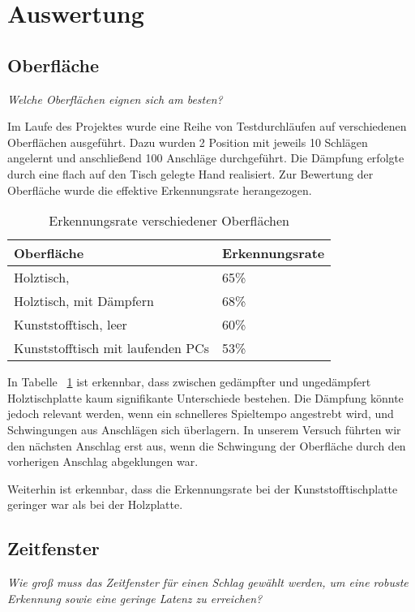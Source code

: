 \section{Auswertung}
\subsection*{Oberfläche}
\textit{Welche Oberflächen eignen sich am besten?}

Im Laufe des Projektes wurde eine Reihe von Testdurchläufen auf verschiedenen Oberflächen ausgeführt. Dazu wurden 2 Position mit jeweils 10 Schlägen angelernt und anschließend 100 Anschläge durchgeführt. Die Dämpfung erfolgte durch eine flach auf den Tisch gelegte Hand realisiert. Zur Bewertung der Oberfläche wurde die effektive Erkennungsrate herangezogen.


\begin{table}[h]   
	\centering
     
     \caption{Erkennungsrate verschiedener Oberflächen}
     \label{tab:surf}
\begin{tabular}{l l}
Oberfläche & Erkennungsrate \\
\hline
Holztisch, & 65\% \\
Holztisch, mit Dämpfern & 68\% \\
Kunststofftisch, leer & 60\% \\
Kunststofftisch mit laufenden PCs & 53\% \\

\end{tabular}
\end{table}



In Tabelle ~\ref{tab:surf} ist erkennbar, dass zwischen gedämpfter und ungedämpfert Holztischplatte kaum signifikante Unterschiede bestehen. Die Dämpfung könnte jedoch relevant werden, wenn ein schnelleres Spieltempo angestrebt wird, und Schwingungen aus Anschlägen sich überlagern. In unserem Versuch führten wir den nächsten Anschlag erst aus, wenn die Schwingung der Oberfläche durch den vorherigen Anschlag abgeklungen war.

Weiterhin ist erkennbar, dass die Erkennungsrate bei der Kunststofftischplatte geringer war als bei der Holzplatte.


\subsection*{Zeitfenster}
\textit{Wie groß muss das Zeitfenster für einen Schlag gewählt werden, um eine robuste Erkennung sowie eine geringe Latenz zu erreichen?}

